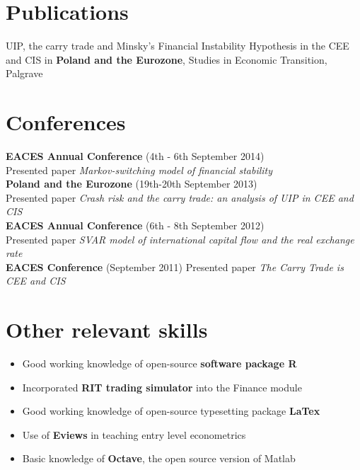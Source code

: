 \documentclass[margin,11pt]{res} %
\begin{document}
\begin{resume}
\section{Publications}
	UIP, the carry trade and Minsky's Financial Instability Hypothesis in the CEE and CIS in {\bf Poland and the Eurozone}, Studies in Economic Transition, Palgrave

\section{Conferences}
 	{\bf EACES Annual Conference} (4th - 6th September 2014) \\
Presented paper \emph{Markov-switching model of financial stability}\\
	{\bf Poland and the Eurozone} (19th-20th September 2013) \\
Presented paper \emph{Crash risk and the carry trade: an analysis of UIP in CEE and CIS}\\
    {\bf EACES Annual Conference} (6th - 8th September 2012) \\
Presented paper \emph{SVAR model of international capital flow and the real exchange rate}\\
    {\bf EACES Conference} (September 2011)
Presented paper \emph{The Carry Trade is CEE and CIS}
 
 
\section{Other relevant skills}
\begin{itemize}
 \item Good working knowledge of open-source \textbf{software package R}
 \item Incorporated \textbf{RIT trading simulator} into the Finance module
\item Good working knowledge of open-source typesetting package \textbf{LaTex}
\item Use of \textbf{Eviews} in teaching entry level econometrics
\item Basic knowledge of \textbf{Octave}, the open source version of Matlab
\end{itemize}


\end{resume}
\end{document}
